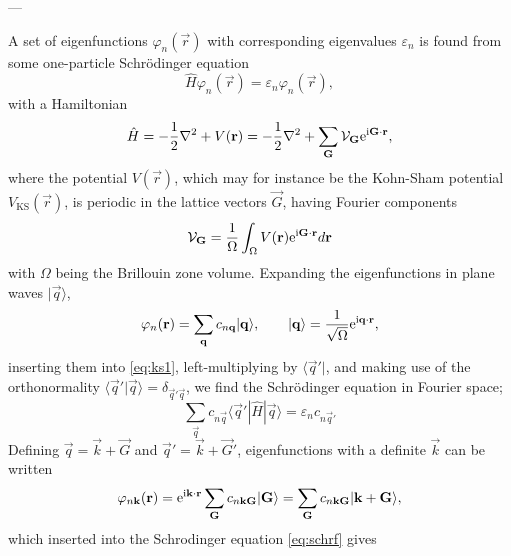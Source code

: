 \documentclass[11pt,bibliography=totoc,index=totoc]{scrbook}   %
\begin{document}
---







A set of eigenfunctions $\varphi_n(\vec{r})$ with corresponding eigenvalues $\varepsilon_n$ is found from some one-particle Schrödinger equation
\begin{equation}
    \hat{H}\varphi_n(\vec{r}) = \varepsilon_n\varphi_n(\vec{r}),
    \label{eq:ks1}
\end{equation}
with a Hamiltonian
\begin{equation}
    \hat{H} = -\frac12 \nabla^2 + V(\boldsymbol{\mathrm{r}}) = -\frac12\nabla^2 + \sum_{\boldsymbol{\mathrm{G}}} \mathcal{V}_{\boldsymbol{\mathrm{G}}} \mathrm{e}^{\mathrm{i}\boldsymbol{\mathrm{G}}\cdot\boldsymbol{\mathrm{r}}},
  \label{eq:hks1}
\end{equation}
where the potential $V(\vec{r})$, which may for instance be the Kohn-Sham potential $V_{\text{KS}}(\vec{r})$, is periodic in the lattice vectors $\vec{G}$, 
having Fourier components
\begin{equation}
    \mathcal{V}_{\boldsymbol{\mathrm{G}}} = \frac{1}{\Omega}\int_{\Omega} V(\boldsymbol{\mathrm{r}}) \mathrm{e}^{\mathrm{i} \boldsymbol{\mathrm{G}}\cdot\boldsymbol{\mathrm{r}}} d\boldsymbol{\mathrm{r}}
\end{equation}
with $\Omega$ being the Brillouin zone volume.
Expanding the eigenfunctions in plane waves $|\vec{q}\rangle$,
\begin{equation}
    \varphi_n(\boldsymbol{\mathrm{r}}) = \sum_{\boldsymbol{\mathrm{q}}} c_{n\boldsymbol{\mathrm{q}}}|\boldsymbol{\mathrm{q}}\rangle,\qquad |\boldsymbol{\mathrm{q}}\rangle = \frac{1}{\sqrt{\Omega}} \mathrm{e}^{\mathrm{i}\boldsymbol{\mathrm{q}}\cdot\boldsymbol{\mathrm{r}}},
    \label{eq:1porb}
\end{equation}
inserting them into \eqref{eq:ks1}, left-multiplying by $\langle\vec{q}'|$, and making use of the orthonormality $\langle \vec{q}'|\vec{q}\rangle = \delta_{\vec{q}'\vec{q}}$, we find the Schrödinger equation in Fourier space;
\begin{equation}
    \sum_{\vec{q}} c_{n\vec{q}} \langle\vec{q}'|\hat{H}|\vec{q}\rangle = \varepsilon_n c_{n\vec{q}'}
    \label{eq:schrf}
\end{equation}
Defining $\vec{q}=\vec{k}+\vec{G}$ and $\vec{q}'=\vec{k}+\vec{G}'$, eigenfunctions with a definite $\vec{k}$ can be written
\begin{equation}
    \varphi_{n\boldsymbol{\mathrm{k}}}(\boldsymbol{\mathrm{r}}) = \mathrm{e}^{\mathrm{i} \boldsymbol{\mathrm{k}}\cdot\boldsymbol{\mathrm{r}}} \sum_{\boldsymbol{\mathrm{G}}} c_{n\boldsymbol{\mathrm{k}}\boldsymbol{\mathrm{G}}}|\boldsymbol{\mathrm{G}} \rangle = \sum_{\boldsymbol{\mathrm{G}}} c_{n\boldsymbol{\mathrm{k}}\boldsymbol{\mathrm{G}}}|\boldsymbol{\mathrm{k}}+\boldsymbol{\mathrm{G}}\rangle,
  \label{eq:psik}
\end{equation}
which inserted into the Schrodinger equation \eqref{eq:schrf} gives
\end{document}
